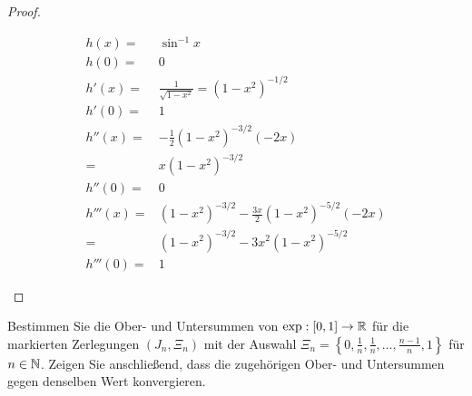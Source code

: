 \begin{proof}
\begin{parts}
		{\allowdisplaybreaks
		\begin{align*}
			h(x)=& \sin^{-1}x\\
			h(0)=&0\\
			h'(x)=&\frac{1}{\sqrt{1-x^2} }=(1-x^2)^{-1 / 2}\\
			h'(0)=&1\\
			h''(x)=&-\frac{1}{2}\left( 1-x^2 \right)^{-3 / 2}(-2x)\\
			=& x(1-x^2)^{-3 / 2}\\
			h''(0) =& 0\\
			h'''(x)=&(1-x^2)^{-3 / 2}-\frac{3x}{2}\left( 1-x^2 \right) ^{- 5 / 2}(-2x)\\
=&(1-x^2)^{-3 / 2}-3x^2\left( 1-x^2 \right) ^{- 5 / 2}\\
h'''(0)=&1
		\end{align*}
	}
	\end{parts}
\end{proof}
\begin{Problem}
	Bestimmen Sie die Ober- und Untersummen von $\exp : [0, 1] \to\mathbb{R}$ für die markierten Zerlegungen $(J_n, \Xi_n)$ mit der Auswahl $\Xi_n = \left\{ 0,\frac{1}{n},\frac{1}{n},\dots,\frac{n-1}{n},1 \right\} $ für $n \in \mathbb{N}$. Zeigen Sie anschließend, dass die zugehörigen Ober- und Untersummen gegen denselben Wert konvergieren.
\end{Problem}

